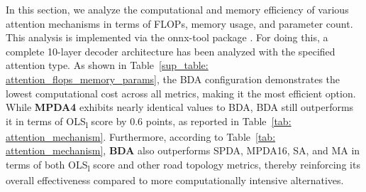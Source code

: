 \begin{table}[t]
\centering
\caption{Comparison of Attention Mechanisms in Terms of Computational and Memory Metrics}
\label{sup_table: attention_flops_memory_params}
\end{table}

In this section, we analyze the computational and memory efficiency of various attention mechanisms in terms of FLOPs, memory usage, and parameter count. This analysis is implemented via the onnx-tool package \cite{onnx_tool}. For doing this, a complete 10-layer decoder architecture has been analyzed with the specified attention type. As shown in Table~\ref{sup_table: attention_flops_memory_params}, the BDA configuration demonstrates the lowest computational cost across all metrics, making it the most efficient option. While \textbf{MPDA4} exhibits nearly identical values to BDA, BDA still outperforms it in terms of OLS\textsubscript{l} score by 0.6 points, as reported in Table~\ref{tab: attention_mechanism}. Furthermore, according to Table~\ref{tab: attention_mechanism}, \textbf{BDA} also outperforms SPDA, MPDA16, SA, and MA in terms of both OLS\textsubscript{l} score and other road topology metrics, thereby reinforcing its overall effectiveness compared to more computationally intensive alternatives.

